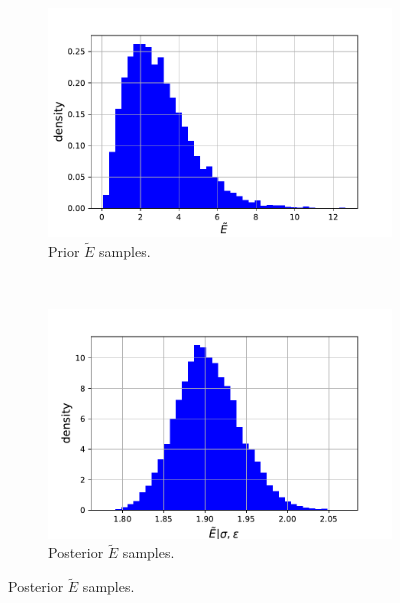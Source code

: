\documentclass{article}
\begin{document}
	\begin{figure}[htb!]
		\centering
		\begin{subfigure}[b]{0.45\textwidth}
			\centering
			\includegraphics[width=\textwidth]{Q3a_1.pdf}
			\caption{Prior $\tilde{E}$ samples.}
		\end{subfigure}
		~
		\begin{subfigure}[b]{0.45\textwidth}
			\centering
			\includegraphics[width=\textwidth]{Q3a_6.pdf}
			\caption{Posterior $\tilde{E}$ samples.}
		\end{subfigure}
	

\end{figure}
\end{document}
